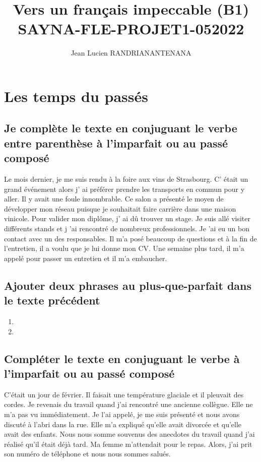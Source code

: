 \documentclass[12pt]{article}
\author{Jean Lucien RANDRIANANTENANA}
\title{Vers un français
impeccable (B1)\\SAYNA-FLE-PROJET1-052022}
\newcommand{\bleu}[1]{{\color{blue}#1}}
\begin{document}
\maketitle
\tableofcontents
\newpage
\section{Les temps du passés}
\subsection{Je complète le texte en conjuguant le verbe entre parenthèse à l'imparfait ou au passé composé}
Le mois dernier, je \bleu{me suis rendu} à la foire aux vins de Strasbourg. C\bleu{' était} un grand événement
alors j\bleu{' ai préférer} prendre les transports en commun pour y aller. Il y \bleu{avait} une foule
innombrable. Ce salon  \bleu{a présenté} le moyen de développer mon réseau puisque je \bleu{souhaitait} faire carrière dans une maison vinicole.
Pour valider mon diplôme, j\bleu{' ai dû} trouver un stage. Je \bleu{suis allé} visiter différents stands et j
\bleu{'ai rencontré} de nombreux professionnels. Je \bleu{'ai eu} un bon contact avec un des responsables.
Il m'\bleu{a posé} beaucoup de questions et à la fin de l’entretien, il \bleu{a voulu} que je lui donne mon
CV. Une semaine plus tard, il m'\bleu{a appelé} pour passer un entretien et il m'\bleu{a embaucher}.
\subsection{Ajouter deux phrases au plus-que-parfait dans le texte précédent}
\begin{enumerate}
	\item  
	\item
\end{enumerate}

\subsection{Compléter le texte en conjuguant le verbe à l’imparfait ou au passé composé}

C'\bleu{était} un jour de février. Il \bleu{faisait} une température glaciale et il \bleu{pleuvait} des cordes.
Je \bleu{revenais} du travail quand j'\bleu{ai rencontré} une ancienne collègue. Elle \bleu{ne m'a pas vu} immédiatement.
Je \bleu{l'ai appelé}, je \bleu{me suis présenté} et nous \bleu{avons discuté} à l’abri dans la rue.
Elle \bleu{m'a expliqué} qu’elle \bleu{avait} divorcée et qu’elle \bleu{avait} des enfants. Nous \bleu{nous somme souvenus} des anecdotes du travail quand j'\bleu{ai réalisé} qu’il \bleu{était} déjà tard.
Ma femme m'\bleu{attendait} pour le repas. Alors, j\bleu{'ai prit} son numéro de téléphone et nous \bleu{nous sommes salués}.
\end{document}
